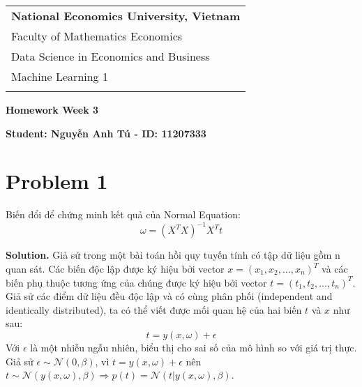 \documentclass[a4paper, 12pt]{article}  %
\begin{document}
\thispagestyle{empty} %

\begin{tabular}{p{12.5cm}} %
{\large \bf National Economics University, Vietnam} \\
Faculty of Mathematics Economics \\ Data Science in Economics and Business  \\ Machine Learning 1\\
\hline %
\\
\end{tabular} %

\vspace*{0.3cm} %

\begin{center} %
	{\Large \bf Homework Week 3} %
	\vspace{2mm}
	
	{\bf Student: Nguyễn Anh Tú - ID: 11207333} %
\end{center}  

\section{Problem 1}

Biến đổi để chứng minh kết quả của Normal Equation:
\[\omega = (X^T X)^{-1} X^T t\]

\textbf{Solution.} Giả sử trong một bài toán hồi quy tuyến tính có tập dữ liệu gồm n quan sát. Các biến độc lập được ký hiệu bởi vector \(x = (x_1, x_2, ..., x_n)^T\) và các biến phụ thuộc tương ứng của chúng được ký hiệu bởi vector \(t = (t_1, t_2, ..., t_n)^T\). Giả sử các điểm dữ liệu đều độc lập và có cùng phân phối (independent and identically distributed), ta có thể viết được mối quan hệ của hai biến $t$ và $x$ như sau: \[t = y(x, \omega) + \epsilon\]
Với $\epsilon$ là một nhiễu ngẫu nhiên, biểu thị cho sai số của mô hình so với giá trị thực. Giả sử \(\epsilon \sim \mathcal{N}(0, \beta)\), vì \(t = y(x, \omega) + \epsilon\) nên \(t \sim \mathcal{N}(y(x, \omega), \beta) \Rightarrow p(t) = \mathcal{N}(t | y(x, \omega), \beta)\).
\end{document}
